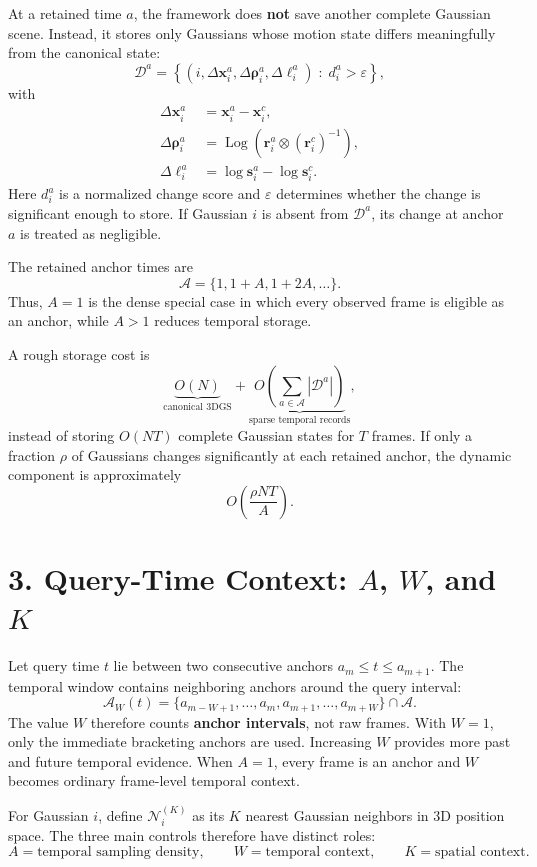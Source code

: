 \documentclass[10pt]{article}
\newcommand{\Da}{\mathcal{D}^{a}}
\newcommand{\Anch}{\mathcal{A}}
\newcommand{\Win}{\mathcal{A}_{W}(t)}
\newcommand{\NKi}{\mathcal{N}_{i}^{(K)}}
\begin{document}
At a retained time $a$, the framework does \textbf{not} save another complete Gaussian scene. Instead, it stores only Gaussians whose motion state differs meaningfully from the canonical state:
\[
\Da =
\left\{
\left(i,\Delta\mathbf{x}_i^a,\Delta\boldsymbol{\rho}_i^a,\Delta\boldsymbol{\ell}_i^a\right)
\;:\;
 d_i^a > \varepsilon
\right\},
\]
with
\begin{align}
\Delta\mathbf{x}_i^a &= \mathbf{x}_i^a-\mathbf{x}_i^c,\\
\Delta\boldsymbol{\rho}_i^a
&= \operatorname{Log}\!\left(\mathbf{r}_i^a\otimes(\mathbf{r}_i^c)^{-1}\right),\\
\Delta\boldsymbol{\ell}_i^a
&= \log \mathbf{s}_i^a-\log \mathbf{s}_i^c.
\end{align}
Here $d_i^a$ is a normalized change score and $\varepsilon$ determines whether the change is significant enough to store. If Gaussian $i$ is absent from $\Da$, its change at anchor $a$ is treated as negligible.

The retained anchor times are
\[
\Anch=\{1,1+A,1+2A,\ldots\}.
\]
Thus, $A=1$ is the dense special case in which every observed frame is eligible as an anchor, while $A>1$ reduces temporal storage.

A rough storage cost is
\[
\underbrace{O(N)}_{\text{canonical 3DGS}}
+
\underbrace{O\!\left(\sum_{a\in\Anch}|\Da|\right)}_{\text{sparse temporal records}},
\]
instead of storing $O(NT)$ complete Gaussian states for $T$ frames. If only a fraction $\rho$ of Gaussians changes significantly at each retained anchor, the dynamic component is approximately
\[
O\!\left(\frac{\rho NT}{A}\right).
\]

\section*{3. Query-Time Context: $A$, $W$, and $K$}

Let query time $t$ lie between two consecutive anchors $a_m\le t\le a_{m+1}$. The temporal window contains neighboring anchors around the query interval:
\[
\Win
=
\{a_{m-W+1},\ldots,a_m,a_{m+1},\ldots,a_{m+W}\}\cap\Anch.
\]
The value $W$ therefore counts \textbf{anchor intervals}, not raw frames. With $W=1$, only the immediate bracketing anchors are used. Increasing $W$ provides more past and future temporal evidence. When $A=1$, every frame is an anchor and $W$ becomes ordinary frame-level temporal context.

For Gaussian $i$, define $\NKi$ as its $K$ nearest Gaussian neighbors in 3D position space. The three main controls therefore have distinct roles:
\[
\boxed{
A=\text{temporal sampling density},\qquad
W=\text{temporal context},\qquad
K=\text{spatial context}.
}
\]
\end{document}
